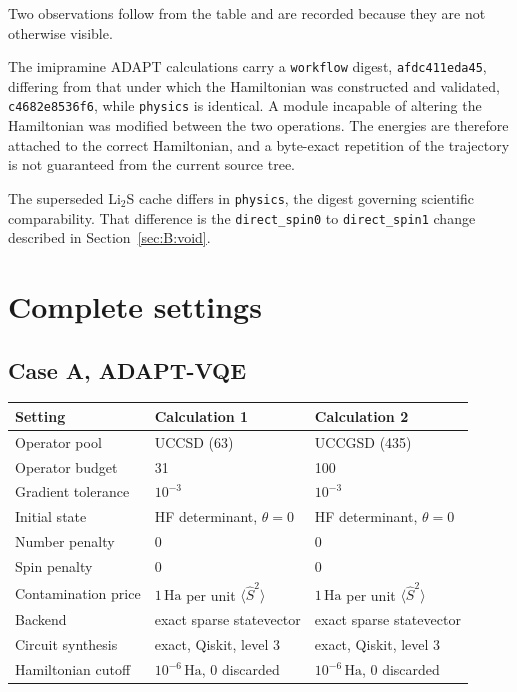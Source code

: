 \documentclass[11pt,a4paper]{article}
\newcommand{\Ha}{\ensuremath{\,\mathrm{Ha}}}
\newcommand{\Ssq}{\ensuremath{\langle \hat{S}^2 \rangle}}
\newcommand{\code}[1]{\texttt{\small #1}}
\newcommand{\LiS}{\texorpdfstring{Li$_2$S}{Li2S}}
\begin{document}
Two observations follow from the table and are recorded because they are not
otherwise visible.

The imipramine ADAPT calculations carry a \code{workflow} digest,
\code{afdc411eda45}, differing from that under which the Hamiltonian was
constructed and validated, \code{c4682e8536f6}, while \code{physics} is
identical. A module incapable of altering the Hamiltonian was modified between
the two operations. The energies are therefore attached to the correct
Hamiltonian, and a byte-exact repetition of the trajectory is not guaranteed
from the current source tree.

The superseded \LiS{} cache differs in \code{physics}, the digest governing
scientific comparability. That difference is the \code{direct\_spin0} to
\code{direct\_spin1} change described in Section~\ref{sec:B:void}.

\section{Complete settings}
\label{app:settings}

\subsection{Case A, ADAPT-VQE}

\begin{center}
\small
\begin{tabular}{@{}lll@{}}
\toprule
Setting & Calculation 1 & Calculation 2 \\
\midrule
Operator pool & UCCSD (63) & UCCGSD (435) \\
Operator budget & 31 & 100 \\
Gradient tolerance & $10^{-3}$ & $10^{-3}$ \\
Initial state & HF determinant, $\theta = 0$ & HF determinant, $\theta = 0$ \\
Number penalty & 0 & 0 \\
Spin penalty & 0 & 0 \\
Contamination price & $1\Ha$ per unit $\Ssq$ & $1\Ha$ per unit $\Ssq$ \\
Backend & exact sparse statevector & exact sparse statevector \\
Circuit synthesis & exact, Qiskit, level 3 & exact, Qiskit, level 3 \\
Hamiltonian cutoff & $10^{-6}\Ha$, 0 discarded & $10^{-6}\Ha$, 0 discarded \\
\bottomrule
\end{tabular}
\end{center}
\end{document}
